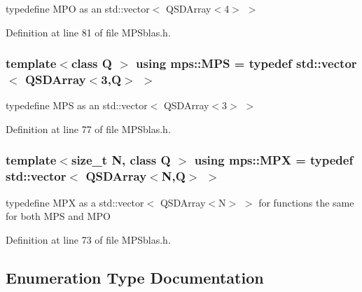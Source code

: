 typedefine M\-P\-O as an std\-::vector$<$ Q\-S\-D\-Array$<$4$>$ $>$ 



Definition at line 81 of file M\-P\-Sblas.\-h.

\subsubsection[{M\-P\-S}]{\setlength{\rightskip}{0pt plus 5cm}template$<$class Q $>$ using {\bf mps\-::\-M\-P\-S} = typedef std\-::vector$<$ {\bf Q\-S\-D\-Array}$<$3,Q$>$ $>$}\label{d1/d7b/namespacemps_a3ec6b7bfece940b1dadb03aeb36fa284}


typedefine M\-P\-S as an std\-::vector$<$ Q\-S\-D\-Array$<$3$>$ $>$ 



Definition at line 77 of file M\-P\-Sblas.\-h.

\subsubsection[{M\-P\-X}]{\setlength{\rightskip}{0pt plus 5cm}template$<$size\-\_\-t N, class Q $>$ using {\bf mps\-::\-M\-P\-X} = typedef std\-::vector$<$ {\bf Q\-S\-D\-Array}$<$N,Q$>$ $>$}\label{d1/d7b/namespacemps_a5838d946f927bd8a88881fe9e29f830d}


typedefine M\-P\-X as a std\-::vector$<$ Q\-S\-D\-Array$<$\-N$>$ $>$ for functions the same for both M\-P\-S and M\-P\-O 



Definition at line 73 of file M\-P\-Sblas.\-h.



\subsection{Enumeration Type Documentation}
